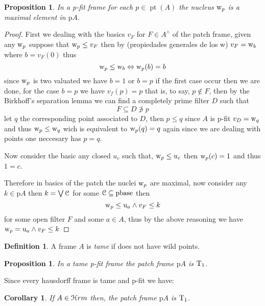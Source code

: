 \documentclass[11pt]{amsart}
\DeclareMathOperator{\pt}{pt}
\newcommand{\niton}{\not\owns}
\theoremstyle{plain}
\newtheorem{cor}[thm]{Corollary}
\newtheorem{prop}[thm]{Proposition}
\theoremstyle{definition}
\newtheorem{dfn}[thm]{Definition}
\begin{document}
\begin{prop}\label{fitpro}
In a {\rm p-fit} frame for each $p\in\pt(A)$ the nucleus ${\rm w}_{p}$ is a maximal element in $\mathrm{p}A$.
\end{prop}



\begin{proof}\label{maxp}
First we dealing with the basics $v_{F}$ for $F\in A^{\wedge}$ of the patch frame, given any ${\rm w}_{p}$ suppose that  
${\rm w}_{p} \leq v_{F}$ then by (propiedades generales de los w) $v_{F}={\rm w}_{b}$ where $b=v_{F}(0)$ thus \[{\rm w}_{p}\leq {\rm w}_{b}\Leftrightarrow {\rm w}_{p}(b)=b\]
 since ${\rm w}_{p}$ is two valuated we have $b=1$ or $b=p$  if the first case occur then we are done, for the case $b=p$ we have $v_{f}(p)=p$ that is, to say, $p\notin F$,
 then by the Birkhoff's separation lemma we can find a completely prime filter $D$ such that \[F\subseteq D\niton p\] let $q$ the corresponding point associated to $D$, then $p\leq q$ since $A$ is 
 {\rm p-fit} $v_{D}={\rm w}_{q}$ and thus ${\rm w}_{p}\leq {\rm w}_{q}$ wich is equivalent to ${\rm w}_{p}(q)=q$ again since we are dealing with points one neccesary has $p=q$.

 Now consider the basic any closed $u_{c}$ such that, ${\rm w}_{p}\leq u_{c}$ then ${\rm w}_{p}(c)=1$ and thus $1=c$.

 Therefore in basics of the patch the nuclei ${\rm w}_{p}$ are maximal, now consider any $k\in \mathrm{p}A$ then $k=\bigvee\EuScript{C}$ for some $\EuScript{C}\subseteq {\rm pbase}$ then 
 \[{\rm w}_{p}\leq {\rm u}_{a}\wedge v_{F}\leq k\] for some open filter $F$ and some $a\in A$, thus by the above reasoning we have ${\rm w}_{p}= {\rm u}_{a}\wedge v_{F}\leq k$ 
\end{proof}

\begin{dfn}\label{tame}
A frame $A$ is \emph{tame} if does not have wild points.
\end{dfn}


\begin{prop}\label{fitpro1}
	In a tame {\rm p-fit} frame the patch frame  $\mathrm{p}A$ is ${\rm T}_{1}$.
	\end{prop}

Since every hausdorff frame is tame and {\rm p-fit} we have:

	\begin{cor}\label{fitpro2}
		If $A\in\EuScript{H}rm$ then, the patch frame  $\mathrm{p}A$ is ${\rm T}_{1}$.
	\end{cor}	
\end{document}
